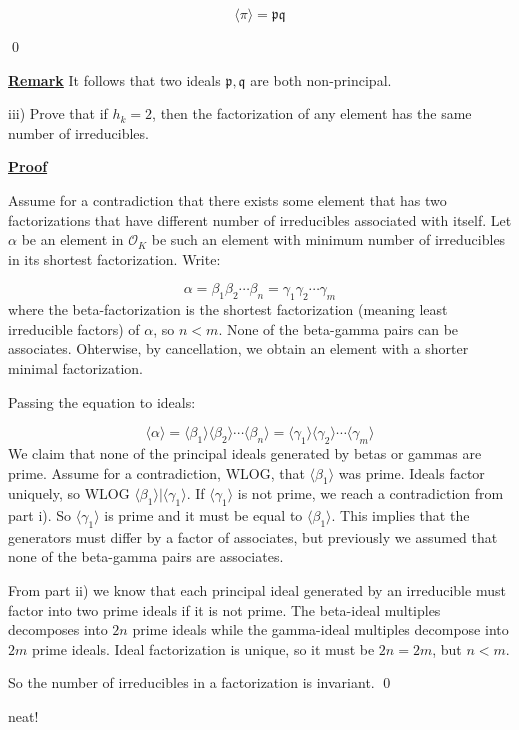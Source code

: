 \documentclass{article}
\newcommand{\new}[1]{
    \vspace{2mm}
    \noindent
    \textbf{
    \underline{#1}}
}
\def\contradiction{{\lightning}}
\newcommand{\Proof}{{
    \vspace{2mm}
    \noindent
    \textbf{
    \underline{Proof}}
}
}
\newcommand{\<}{{{
    \langle
}}}
\def\>{{{
    \rangle
}}}
\newcommand{\ringInt}{
    {\mathcal{O}}
}
\newcommand{\pideal}{
    {{\mathfrak{p}}}
}
\newcommand{\qideal}{
    {{\mathfrak{q}}}
}
\begin{document}
\[
    \<\pi\> = \pideal \qideal
\]

\qed

\new{Remark} It follows that two ideals $\pideal, \qideal$ 
are both non-principal. 

iii) Prove that if $h_k = 2$, then the factorization 
of any element has the same number of irreducibles. 

\Proof 

Assume for a contradiction that there exists 
some element that has two factorizations that have different 
number of irreducibles associated with itself. Let $\alpha$ 
be an element in $\ringInt_K$ be such an element with minimum 
number of irreducibles in its shortest factorization. Write:

\[
    \alpha = \beta_1 \beta_2 \cdots \beta_n = 
    \gamma_1 \gamma _2 \cdots \gamma_m
\]
where the beta-factorization is the shortest factorization 
(meaning least irreducible factors) of $\alpha$, so $n<m$.  
None of the beta-gamma pairs can be associates. Ohterwise, 
by cancellation, we obtain an element with a shorter minimal
factorization. 

Passing the equation to ideals:

\[
    \<\alpha\> = \<\beta_1\>\<\beta_2\> \cdots \<\beta_n\> 
    =
    \<\gamma_1\>\<\gamma_2\> \cdots \<\gamma_m\>
\]
We claim that none of the principal ideals generated by 
betas or gammas are prime. Assume for a contradiction, WLOG, that 
$\<\beta_1\>$ was prime. Ideals factor uniquely, so WLOG 
$\<\beta_1\>|\<\gamma_1\>$. If $\<\gamma_1\>$ is not prime, we 
reach a contradiction from part i). So $\<\gamma_1\>$ is prime 
and it must be equal to $\<\beta_1\>$. This implies that 
the generators must differ by a factor of associates, but previously 
we assumed that none of the beta-gamma pairs are associates. \contradiction 

From part ii) we know that each principal ideal generated by 
an irreducible must factor into two prime ideals if it is not prime. 
The beta-ideal multiples decomposes into $2n$ prime ideals while 
the gamma-ideal multiples decompose into $2m$ prime ideals. Ideal 
factorization is unique, so it must be $2n = 2m$, but $n < m$. \contradiction 

So the number of irreducibles in a factorization is invariant. 
\qed

\color{blue}
neat!
\end{document}
